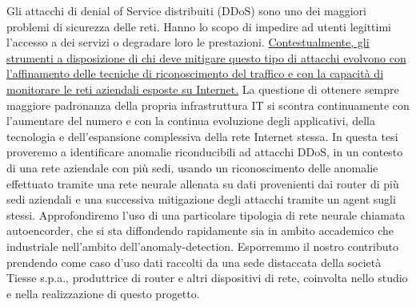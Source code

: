 


\italiano
\sommario

Gli attacchi di denial of Service distribuiti (DDoS) sono uno dei maggiori problemi di sicurezza delle reti. Hanno lo scopo di impedire ad utenti legittimi l'accesso a dei servizi o degradare loro le prestazioni. \uline{Contestualmente, gli strumenti a disposizione di chi deve mitigare questo tipo di attacchi evolvono con l'affinamento delle tecniche di riconoscimento del traffico e con la capacità di monitorare le reti aziendali esposte su Internet.} La questione di ottenere sempre maggiore padronanza della propria infrastruttura IT si scontra continuamente con l'aumentare del numero e con la continua evoluzione degli applicativi, della tecnologia e dell'espansione complessiva della rete Internet stessa. In questa tesi proveremo a identificare anomalie riconducibili ad attacchi DDoS, in un contesto di una rete aziendale con più sedi, usando un riconoscimento delle anomalie effettuato tramite  una rete neurale allenata su dati provenienti dai router di più sedi aziendali e una successiva mitigazione degli attacchi tramite un agent sugli stessi. Approfondiremo l'uso di una particolare tipologia di rete neurale chiamata autoencorder, che si sta diffondendo rapidamente sia in ambito accademico che industriale nell'ambito dell'anomaly-detection. Esporremmo il nostro contributo prendendo come caso d'uso dati raccolti da una sede distaccata della società Tiesse s.p.a., produttrice di router e altri dispositivi di rete, coinvolta nello studio e nella realizzazione di questo progetto.
